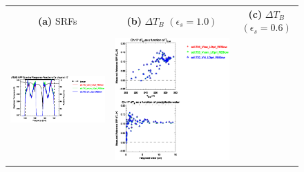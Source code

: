 \begin{figure}[H]
  \centering
  \begin{tabular}{c c c}
    \textsf{\textbf{(a)} SRFs} &
    \textsf{\textbf{(b)} $\Delta T_B$ $(\epsilon_s = 1.0)$} &
    \textsf{\textbf{(c)} $\Delta T_B$ $(\epsilon_s = 0.6)$} \\
    \includegraphics[bb=80 400 280 558,clip,scale=0.85]{graphics/srf/Vset/atms_npp.ch17.osrf.eps} &
    \includegraphics[bb=85 400 260 558,clip,scale=0.85]{graphics/dtb/Vset/e1.0_r0.0/atms_npp.ch17.dTb.eps} & 

\end{tabular}
\end{figure}
